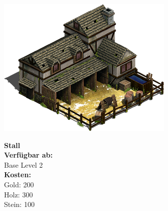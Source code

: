 \documentclass{scrartcl}
\begin{document}
\begin{minipage}{0.3\textwidth}
	\includegraphics[width=\textwidth]{imgStable.png}
\end{minipage}
\hfill
\begin{minipage}{0.5\textwidth}
	\textbf{Stall}\\
	
	\textbf{Verfügbar ab: }\\ Base Level 2\\
	\textbf{Kosten:
	}\\
	Gold: 200 \\
	Holz: 300\\
	Stein: 100\\
	
\end{minipage}
\end{document}
